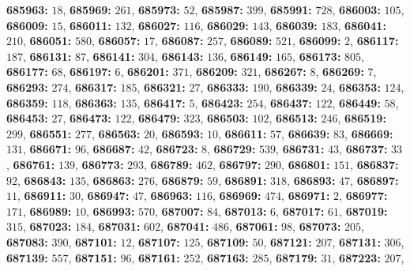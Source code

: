 \textsf{\bfseries 685963:} $18$, \textsf{\bfseries 685969:} $261$, \textsf{\bfseries 685973:} $52$, \textsf{\bfseries 685987:} $399$, \textsf{\bfseries 685991:} $728$, \textsf{\bfseries 686003:} $105$, \textsf{\bfseries 686009:} $15$, \textsf{\bfseries 686011:} $132$, \textsf{\bfseries 686027:} $116$, \textsf{\bfseries 686029:} $143$, \textsf{\bfseries 686039:} $183$, \textsf{\bfseries 686041:} $210$, \textsf{\bfseries 686051:} $580$, \textsf{\bfseries 686057:} $17$, \textsf{\bfseries 686087:} $257$, \textsf{\bfseries 686089:} $521$, \textsf{\bfseries 686099:} $2$, \textsf{\bfseries 686117:} $187$, \textsf{\bfseries 686131:} $87$, \textsf{\bfseries 686141:} $304$, \textsf{\bfseries 686143:} $136$, \textsf{\bfseries 686149:} $165$, \textsf{\bfseries 686173:} $805$, \textsf{\bfseries 686177:} $68$, \textsf{\bfseries 686197:} $6$, \textsf{\bfseries 686201:} $371$, \textsf{\bfseries 686209:} $321$, \textsf{\bfseries 686267:} $8$, \textsf{\bfseries 686269:} $7$, \textsf{\bfseries 686293:} $274$, \textsf{\bfseries 686317:} $185$, \textsf{\bfseries 686321:} $27$, \textsf{\bfseries 686333:} $190$, \textsf{\bfseries 686339:} $24$, \textsf{\bfseries 686353:} $124$, \textsf{\bfseries 686359:} $118$, \textsf{\bfseries 686363:} $135$, \textsf{\bfseries 686417:} $5$, \textsf{\bfseries 686423:} $254$, \textsf{\bfseries 686437:} $122$, \textsf{\bfseries 686449:} $58$, \textsf{\bfseries 686453:} $27$, \textsf{\bfseries 686473:} $122$, \textsf{\bfseries 686479:} $323$, \textsf{\bfseries 686503:} $102$, \textsf{\bfseries 686513:} $246$, \textsf{\bfseries 686519:} $299$, \textsf{\bfseries 686551:} $277$, \textsf{\bfseries 686563:} $20$, \textsf{\bfseries 686593:} $10$, \textsf{\bfseries 686611:} $57$, \textsf{\bfseries 686639:} $83$, \textsf{\bfseries 686669:} $131$, \textsf{\bfseries 686671:} $96$, \textsf{\bfseries 686687:} $42$, \textsf{\bfseries 686723:} $8$, \textsf{\bfseries 686729:} $539$, \textsf{\bfseries 686731:} $43$, \textsf{\bfseries 686737:} $33$, \textsf{\bfseries 686761:} $139$, \textsf{\bfseries 686773:} $293$, \textsf{\bfseries 686789:} $462$, \textsf{\bfseries 686797:} $290$, \textsf{\bfseries 686801:} $151$, \textsf{\bfseries 686837:} $92$, \textsf{\bfseries 686843:} $135$, \textsf{\bfseries 686863:} $276$, \textsf{\bfseries 686879:} $59$, \textsf{\bfseries 686891:} $318$, \textsf{\bfseries 686893:} $47$, \textsf{\bfseries 686897:} $11$, \textsf{\bfseries 686911:} $30$, \textsf{\bfseries 686947:} $47$, \textsf{\bfseries 686963:} $116$, \textsf{\bfseries 686969:} $474$, \textsf{\bfseries 686971:} $2$, \textsf{\bfseries 686977:} $171$, \textsf{\bfseries 686989:} $10$, \textsf{\bfseries 686993:} $570$, \textsf{\bfseries 687007:} $84$, \textsf{\bfseries 687013:} $6$, \textsf{\bfseries 687017:} $61$, \textsf{\bfseries 687019:} $315$, \textsf{\bfseries 687023:} $184$, \textsf{\bfseries 687031:} $602$, \textsf{\bfseries 687041:} $486$, \textsf{\bfseries 687061:} $98$, \textsf{\bfseries 687073:} $205$, \textsf{\bfseries 687083:} $390$, \textsf{\bfseries 687101:} $12$, \textsf{\bfseries 687107:} $125$, \textsf{\bfseries 687109:} $50$, \textsf{\bfseries 687121:} $207$, \textsf{\bfseries 687131:} $306$, \textsf{\bfseries 687139:} $557$, \textsf{\bfseries 687151:} $96$, \textsf{\bfseries 687161:} $252$, \textsf{\bfseries 687163:} $285$, \textsf{\bfseries 687179:} $31$, \textsf{\bfseries 687223:} $207$, 
